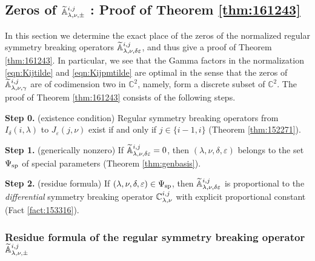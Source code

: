 \subsection{Zeros of ${\widetilde{\mathbb{A}}}_{{\lambda},{\nu},{\pm}}^{{i,j}}$ : Proof of Theorem \ref{thm:161243}}
\label{subsec:Aijzero}
In this section 
 we determine the exact place of the zeros
 of the normalized regular symmetry breaking operators
 ${\widetilde{\mathbb{A}}}_{{\lambda},{\nu},{\delta\varepsilon}}^{{i,j}}$, 
 and thus give a proof 
 of Theorem \ref{thm:161243}.  
In particular,
 we see that the Gamma factors
 in the normalization \eqref{eqn:Kijtilde} and \eqref{eqn:Kijpmtilde}
 are optimal 
 in the sense
 that the zeros of ${\widetilde{\mathbb{A}}}_{{\lambda},{\nu},{\gamma}}^{{i,j}}$
 are of codimension two in ${\mathbb{C}}^2$, 
 namely,
 form a discrete subset of ${\mathbb{C}}^2$. 
The proof of Theorem \ref{thm:161243}
 consists of the following steps.  
\par\noindent
{\bf{Step 0.}}\enspace
(existence condition)\enspace
Regular symmetry breaking operators from 
 $I_{\delta}(i,\lambda)$ to $J_{\varepsilon}(j,\nu)$ exist
 if and only if $j \in \{i-1,i\}$
 (Theorem \ref{thm:152271}).  
\par\noindent
{\bf{Step 1.}}\enspace
(generically nonzero)\enspace
If ${\widetilde{\mathbb{A}}}_{{\lambda},{\nu},{\delta\varepsilon}}^{{i,j}}=0$, 
 then $(\lambda, \nu, \delta, \varepsilon)$ belongs to the set 
 $\Psi_{{\operatorname{sp}}}$ 
 of special parameters
 (Theorem \ref{thm:genbasis}).  
\par\noindent
{\bf{Step 2.}}\enspace
(residue formula)\enspace
If $(\lambda, \nu, \delta, \varepsilon)\in \Psi_{{\operatorname{sp}}}$, 
 then ${\widetilde{\mathbb{A}}}_{{\lambda},{\nu},{\delta\varepsilon}}^{{i,j}}$ is proportional
 to the {\it{differential}} symmetry breaking operator
 ${\mathbb{C}}_{{\lambda},{\nu}}^{{i,j}}$ 
 with explicit proportional constant
 (Fact \ref{fact:153316}).  

\subsubsection{Residue formula of the regular symmetry breaking operator
 ${\widetilde{\mathbb{A}}}_{{\lambda},{\nu},{\pm}}^{{i,j}}$}

